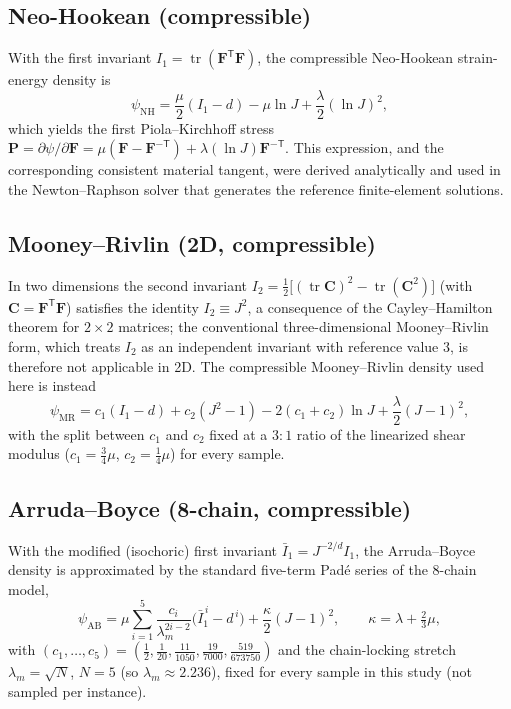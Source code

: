 \documentclass[final,5p,times]{elsarticle}
\begin{document}
\subsection{Neo-Hookean (compressible)}
With the first invariant $I_1 = \operatorname{tr}(\mathbf{F}^{\mathsf T}\mathbf{F})$,
the compressible Neo-Hookean strain-energy density is
\begin{equation}
  \psi_{\text{NH}} = \frac{\mu}{2}(I_1 - d) - \mu \ln J + \frac{\lambda}{2}(\ln J)^2,
  \label{eq:neo-hookean}
\end{equation}
which yields the first Piola--Kirchhoff stress
$\mathbf{P} = \partial\psi/\partial\mathbf{F} = \mu(\mathbf{F}-\mathbf{F}^{-\mathsf T}) + \lambda(\ln J)\mathbf{F}^{-\mathsf T}$.
This expression, and the corresponding consistent material tangent, were
derived analytically and used in the Newton\mbox{--}Raphson solver that generates
the reference finite-element solutions.

\subsection{Mooney--Rivlin (2D, compressible)}
In two dimensions the second invariant $I_2 = \tfrac12\big[(\operatorname{tr}\mathbf{C})^2 - \operatorname{tr}(\mathbf{C}^2)\big]$
(with $\mathbf{C}=\mathbf{F}^{\mathsf T}\mathbf{F}$) satisfies the identity
$I_2 \equiv J^2$, a consequence of the Cayley--Hamilton theorem for
$2\times 2$ matrices; the conventional three-dimensional Mooney--Rivlin form,
which treats $I_2$ as an independent invariant with reference value $3$, is
therefore not applicable in 2D. The compressible Mooney--Rivlin density used
here is instead
\begin{equation}
  \psi_{\text{MR}} = c_1(I_1-d) + c_2(J^2-1) - 2(c_1+c_2)\ln J + \frac{\lambda}{2}(J-1)^2,
  \label{eq:mooney-rivlin}
\end{equation}
with the split between $c_1$ and $c_2$ fixed at a $3{:}1$ ratio of the
linearized shear modulus ($c_1 = \tfrac34\mu$, $c_2=\tfrac14\mu$) for every
sample.

\subsection{Arruda--Boyce (8-chain, compressible)}
With the modified (isochoric) first invariant $\bar I_1 = J^{-2/d} I_1$, the
Arruda--Boyce density is approximated by the standard five-term Pad\'e series
of the 8-chain model,
\begin{equation}
  \psi_{\text{AB}} = \mu \sum_{i=1}^{5} \frac{c_i}{\lambda_m^{2i-2}}\big(\bar I_1^{\,i} - d^{\,i}\big)
  + \frac{\kappa}{2}(J-1)^2, \qquad \kappa = \lambda + \tfrac{2}{3}\mu,
  \label{eq:arruda-boyce}
\end{equation}
with $(c_1,\dots,c_5) = (\tfrac12,\tfrac{1}{20},\tfrac{11}{1050},\tfrac{19}{7000},\tfrac{519}{673750})$
and the chain-locking stretch $\lambda_m=\sqrt{N}$, $N=5$ (so
$\lambda_m\approx2.236$), fixed for every sample in this study (not
sampled per instance).
\end{document}
